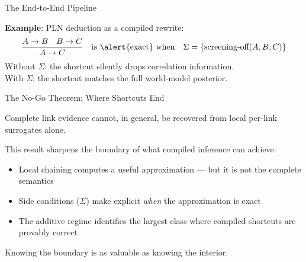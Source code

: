 \documentclass[aspectratio=169,11pt]{beamer}
\begin{document}
\begin{frame}{The End-to-End Pipeline}

\begin{center}
\end{center}

\medskip
\textbf{Example}: PLN deduction as a compiled rewrite:
\[
  \frac{A \to B \quad B \to C}{A \to C}
  \quad\text{is \alert{exact} when}\quad
  \Sigma = \{\text{screening-off}(A, B, C)\}
\]
Without $\Sigma$: the shortcut silently drops correlation information.\\
With $\Sigma$: the shortcut matches the full world-model posterior.

\end{frame}

\begin{frame}{The No-Go Theorem: Where Shortcuts End}

\begin{theorem}
Complete link evidence cannot, in general, be recovered
from local per-link surrogates alone.
\end{theorem}

\bigskip
This result \alert{sharpens the boundary} of what compiled
inference can achieve:

\begin{itemize}
\item Local chaining computes a useful approximation ---
      but it is not the complete semantics
\item Side conditions ($\Sigma$) make explicit \emph{when}
      the approximation is exact
\item The additive regime identifies the largest class
      where compiled shortcuts are provably correct
\end{itemize}

\medskip
Knowing the boundary is as valuable as knowing the interior.

\end{frame}
\end{document}
